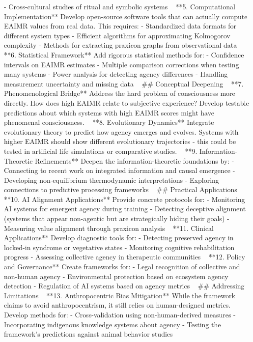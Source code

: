 \documentclass{article}
\begin{document}
- Cross-cultural studies of ritual and symbolic systems
 
**5. Computational Implementation**
Develop open-source software tools that can actually compute EAIMR values from real data. This requires:
- Standardized data formats for different system types
- Efficient algorithms for approximating Kolmogorov complexity
- Methods for extracting praxicon graphs from observational data
 
**6. Statistical Framework**
Add rigorous statistical methods for:
- Confidence intervals on EAIMR estimates
- Multiple comparison corrections when testing many systems
- Power analysis for detecting agency differences
- Handling measurement uncertainty and missing data
 
## Conceptual Deepening
 
**7. Phenomenological Bridge**
Address the hard problem of consciousness more directly. How does high EAIMR relate to subjective experience? Develop testable predictions about which systems with high EAIMR scores might have phenomenal consciousness.
 
**8. Evolutionary Dynamics**
Integrate evolutionary theory to predict how agency emerges and evolves. Systems with higher EAIMR should show different evolutionary trajectories - this could be tested in artificial life simulations or comparative studies.
 
**9. Information-Theoretic Refinements**
Deepen the information-theoretic foundations by:
- Connecting to recent work on integrated information and causal emergence
- Developing non-equilibrium thermodynamic interpretations
- Exploring connections to predictive processing frameworks
 
## Practical Applications
 
**10. AI Alignment Applications**
Provide concrete protocols for:
- Monitoring AI systems for emergent agency during training
- Detecting deceptive alignment (systems that appear non-agentic but are strategically hiding their goals)
- Measuring value alignment through praxicon analysis
 
**11. Clinical Applications**
Develop diagnostic tools for:
- Detecting preserved agency in locked-in syndrome or vegetative states
- Monitoring cognitive rehabilitation progress
- Assessing collective agency in therapeutic communities
 
**12. Policy and Governance**
Create frameworks for:
- Legal recognition of collective and non-human agency
- Environmental protection based on ecosystem agency detection
- Regulation of AI systems based on agency metrics
 
## Addressing Limitations
 
**13. Anthropocentric Bias Mitigation**
While the framework claims to avoid anthropocentrism, it still relies on human-designed metrics. Develop methods for:
- Cross-validation using non-human-derived measures
- Incorporating indigenous knowledge systems about agency
- Testing the framework's predictions against animal behavior studies
\end{document}

